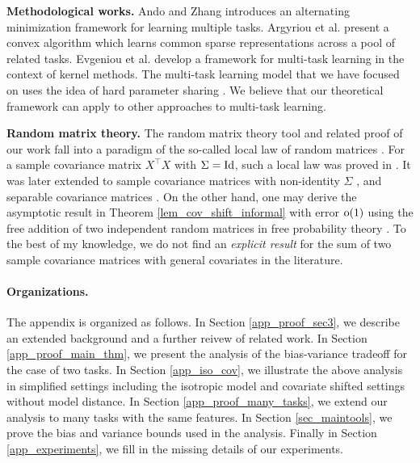 \medskip
\noindent\textbf{Methodological works.}
Ando and Zhang \cite{AZ05} introduces an alternating minimization framework for learning multiple tasks.
Argyriou et al. \cite{AEP08} present a convex algorithm which learns common sparse representations across a pool of related tasks.
Evgeniou et al. \cite{EMP05} develop a framework for multi-task learning in the context of kernel methods.
The multi-task learning model that we have focused on uses the idea of hard parameter sharing \cite{C93,KD12,R17}.
We believe that our theoretical framework can apply to other approaches to multi-task learning.

\medskip
\noindent\textbf{Random matrix theory.}
The random matrix theory tool and related proof of our work fall into a paradigm of the so-called local law of random matrices \cite{erdos2017dynamical}.
For a sample covariance matrix $X^\top X$ with $\Sigma=\operatorname{Id}$, such a local law was proved in \cite{isotropic}.
It was later extended to sample covariance matrices with non-identity $\Sigma$ \cite{Anisotropic}, and separable covariance matrices \cite{yang2019spiked}. On the other hand, one may derive the asymptotic result in Theorem \ref{lem_cov_shift_informal} with error $\operatorname{o}(1)$ using the free addition of two independent random matrices in free probability theory \cite{nica2006lectures}. To the best of my knowledge, we do not find an {\it explicit result} for the sum of two sample covariance matrices with general covariates in the literature.



\paragraph{Organizations.}
 The appendix is organized as follows.
In Section \ref{app_proof_sec3}, we describe an extended background and a further reivew of related work.
In Section \ref{app_proof_main_thm}, we present the analysis of the bias-variance tradeoff for the case of two tasks.
In Section \ref{app_iso_cov}, we illustrate the above analysis in simplified settings including the isotropic model and covariate shifted settings without model distance.
In Section \ref{app_proof_many_tasks}, we extend our analysis to many tasks with the same features.
In Section \ref{sec_maintools}, we prove the bias and variance bounds used in the analysis.
Finally in Section \ref{app_experiments}, we fill in the missing details of our experiments.



